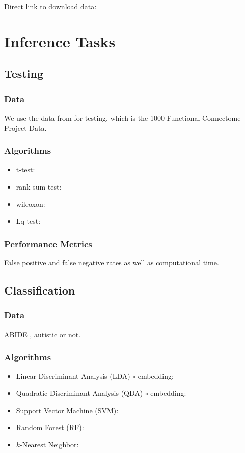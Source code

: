Direct link to download data:

\section{Inference Tasks}
\subsection{Testing}


\subsubsection{Data}

We use the data from \cite{Elkund2013} for testing, which is the 1000 Functional Connectome Project Data.

\subsubsection{Algorithms}

\begin{itemize} \itemsep0pt
	\item t-test:
	\item rank-sum test:
	\item wilcoxon:
	\item Lq-test: 
\end{itemize}


\subsubsection{Performance Metrics}


False positive and false negative rates as well as computational time.


\subsection{Classification}

\subsubsection{Data}

ABIDE \cite{abide}, autistic or not.

\subsubsection{Algorithms}

\begin{itemize} \itemsep0pt
	\item Linear Discriminant Analysis (LDA) $\circ$ embedding:
	\item Quadratic Discriminant Analysis (QDA) $\circ$ embedding:
	\item Support Vector Machine (SVM):
	\item Random Forest (RF):
	\item $k$-Nearest Neighbor: 
\end{itemize}

